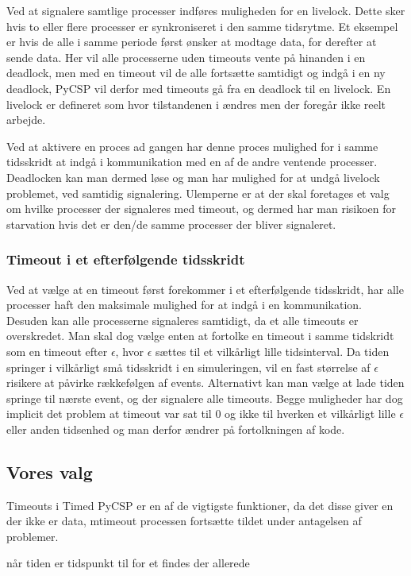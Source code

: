 Ved at signalere samtlige processer indføres muligheden for en
livelock. Dette sker hvis to eller flere processer er synkroniseret i
den samme tidsrytme. Et eksempel er hvis de alle i samme periode først
ønsker at modtage data, for derefter at sende data. Her vil alle
processerne uden timeouts vente på hinanden i en deadlock, men med en
timeout vil de alle fortsætte samtidigt og indgå i en ny deadlock,
PyCSP vil derfor med timeouts gå fra en deadlock til en livelock. En
livelock er defineret som hvor tilstandenen i ændres men der foregår
ikke reelt arbejde.

Ved at aktivere en proces ad gangen har denne proces mulighed for i
samme tidsskridt at indgå i kommunikation med en af de andre ventende
processer. Deadlocken kan man dermed løse og man har mulighed for at
undgå livelock problemet, ved samtidig signalering. Ulemperne er at der
skal foretages et valg om hvilke processer der signaleres med timeout,
og dermed har man risikoen for starvation hvis det er
den/de samme processer der bliver signaleret.

\subsubsection{Timeout i et efterfølgende tidsskridt} Ved at vælge at
en timeout først forekommer i et efterfølgende tidsskridt, har alle
processer haft den maksimale mulighed for at indgå i en kommunikation.
Desuden kan alle processerne signaleres samtidigt, da et alle timeouts
er overskredet. Man skal dog vælge enten at fortolke en timeout i samme
tidskridt som en timeout efter $\epsilon$, hvor $\epsilon$ sættes til
et vilkårligt lille tidsinterval. Da tiden springer i vilkårligt små
tidsskridt i en simuleringen, vil en fast størrelse af $\epsilon$
risikere at påvirke rækkefølgen af events. Alternativt kan man vælge
at lade tiden springe til nærste event, og der signalere alle timeouts.
Begge muligheder har dog implicit det problem at timeout var sat til
0 og ikke til hverken et vilkårligt lille $\epsilon$ eller anden
tidsenhed og man derfor ændrer på fortolkningen af kode.

\subsection{Vores valg}

Timeouts i Timed PyCSP er en af de vigtigste funktioner, da det disse
giver en der ikke er data, mtimeout processen fortsætte tildet under
antagelsen af problemer.

når tiden er tidspunkt til for et findes der allerede 
